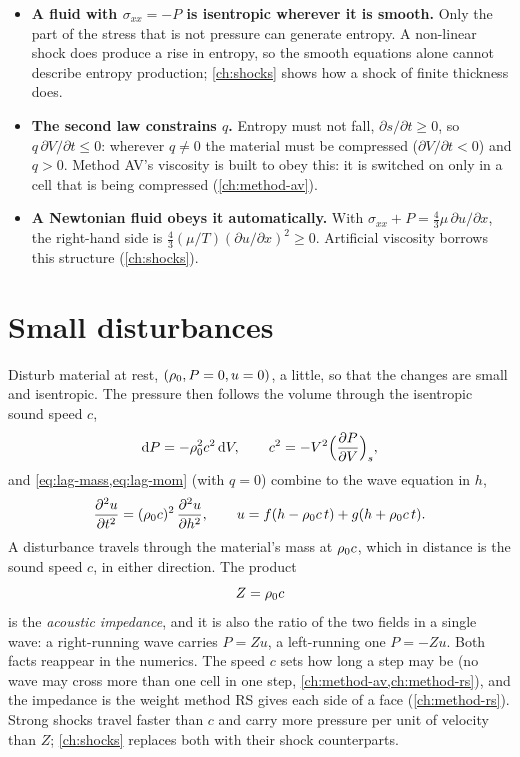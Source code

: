 \begin{itemize}
\item \textbf{A fluid with $\sigma_{xx} = -P$ is isentropic wherever it is
  smooth.} Only the part of the stress that is not pressure can generate
  entropy. A non-linear shock does produce a rise in entropy, so the smooth
  equations alone cannot describe entropy production; \cref{ch:shocks}
  shows how a shock of finite thickness does.
\item \textbf{The second law constrains $q$.} Entropy must not fall,
  $\partial s/\partial t \ge 0$, so $q\,\partial V/\partial t \le 0$:
  wherever $q \ne 0$ the material must be compressed ($\partial
  V/\partial t < 0$) and $q > 0$. Method AV's viscosity is built to obey
  this: it is switched on only in a cell that is being compressed
  (\cref{ch:method-av}).
\item \textbf{A Newtonian fluid obeys it automatically.} With $\sigma_{xx}
  + P = \tfrac{4}{3}\mu\,\partial u/\partial x$, the right-hand side is
  $\tfrac{4}{3}(\mu/T)(\partial u/\partial x)^2 \ge 0$. Artificial
  viscosity borrows this structure (\cref{ch:shocks}).
\end{itemize}

\section{Small disturbances}
\label{sec:acoustics}

Disturb material at rest, $(\rho_0, P = 0, u = 0)$, a little, so that the
changes are small and isentropic. The pressure then follows the volume
through the isentropic sound speed $c$,
\begin{equation}
\mathrm{d} P = -\rho_0^2 c^2\,\mathrm{d} V,
\qquad
c^2 = -V^2\Bigl(\frac{\partial P}{\partial V}\Bigr)_s ,
\label{eq:cm-c}
\end{equation}
and \cref{eq:lag-mass,eq:lag-mom} (with $q = 0$) combine to the wave
equation in $h$,
\begin{equation}
\frac{\partial^2 u}{\partial t^2} = (\rho_0 c)^2\,\frac{\partial^2 u}{\partial h^2},
\qquad
u = f(h - \rho_0 c\,t) + g(h + \rho_0 c\,t).
\label{eq:cm-wave}
\end{equation}
A disturbance travels through the material's mass at $\rho_0 c$, which in
distance is the sound speed $c$, in either direction. The product
\begin{equation}
Z = \rho_0 c
\label{eq:cm-impedance}
\end{equation}
is the \emph{acoustic impedance}, and it is also the ratio of the two
fields in a single wave: a right-running wave carries $P = Z u$, a
left-running one $P = -Z u$. Both facts reappear in the numerics. The
speed $c$ sets how long a step may be (no wave may cross more than one
cell in one step, \cref{ch:method-av,ch:method-rs}), and the impedance is
the weight method RS gives each side of a face (\cref{ch:method-rs}).
Strong shocks travel faster than $c$ and carry more pressure per unit of
velocity than $Z$; \cref{ch:shocks} replaces both with their shock
counterparts.

